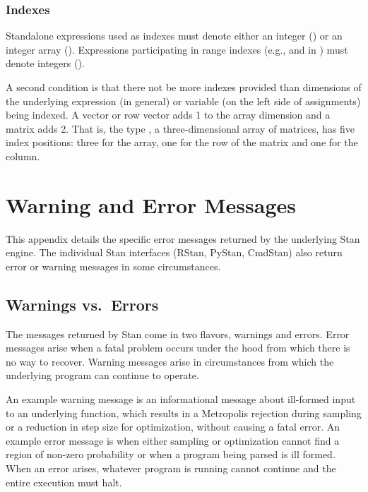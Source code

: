 \subsection{Indexes}

Standalone expressions used as indexes must denote either an integer
() or an integer array ().  Expressions
participating in range indexes (e.g.,  and  in
) must denote integers ().

A second condition is that there not be more indexes provided than
dimensions of the underlying expression (in general) or variable (on
the left side of assignments) being indexed.  A vector or row vector
adds 1 to the array dimension and a matrix adds 2.  That is, the type
, a three-dimensional array of matrices, has five
index positions: three for the array, one for the row of the matrix
and one for the column.

\chapter{Warning and Error Messages}\label{error-messages.appendix}

\noindent
This appendix details the specific error messages returned by the
underlying Stan engine.  The individual Stan interfaces (RStan,
PyStan, CmdStan) also return error or warning messages in some
circumstances.

\section{Warnings vs.\ Errors}

The messages returned by Stan come in two flavors, warnings and
errors.  Error messages arise when a fatal problem occurs under the
hood from which there is no way to recover.  Warning messages arise
in circumstances from which the underlying program can continue to
operate.

An example warning message is an informational message about
ill-formed input to an underlying function, which results in a
Metropolis rejection during sampling or a reduction in step size for
optimization, without causing a fatal error.  An example error message
is when either sampling or optimization cannot find a region of
non-zero probability or when a program being parsed is ill formed.
When an error arises, whatever program is running cannot continue and
the entire execution must halt.

